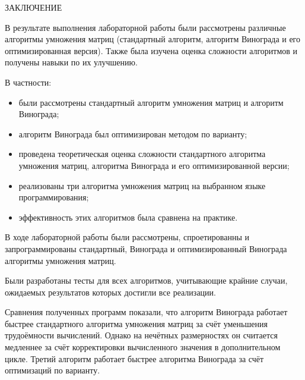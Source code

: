 \begin{center}
    \MakeUppercase{\large Заключение}
\end{center}

В результате выполнения лабораторной работы были рассмотрены различные алгоритмы умножения матриц (стандартный алгоритм, алгоритм Винограда и его оптимизированная версия). Также была изучена оценка сложности алгоритмов и получены навыки по их улучшению.

\vspace{0.25cm}
В частности:

\begin{itemize}

\item были рассмотрены стандартный алгоритм умножения матриц и алгоритм Винограда;

\item алгоритм Винограда был оптимизирован методом по варианту;

\item проведена теоретическая оценка сложности стандартного алгоритма умножения матриц, алгоритма Винограда и его оптимизированной версии;

\item реализованы три алгоритма умножения матриц на выбранном языке программирования;

\item эффективность этих алгоритмов была сравнена на практике.

\end{itemize}

В ходе лабораторной работы были рассмотрены, спроетированны и запрограммированы стандартный, Винограда и оптимизированный Винограда алгоритмы умножения матриц.

Были разработаны тесты для всех алгоритмов, учитывающие крайние случаи, ожидаемых результатов которых достигли все реализации.

Сравнения полученных программ показали, что алгоритм Винограда работает быстрее стандартного алгоритма умножения матриц за счёт уменьшения трудоёмности вычислений. Однако на нечётных размерностях он считается медленнее за счёт корректировки вычисленного значения в дополнительном цикле. Третий алгоритм работает быстрее алгоритма Винограда за счёт оптимизаций по варианту.

\newpage